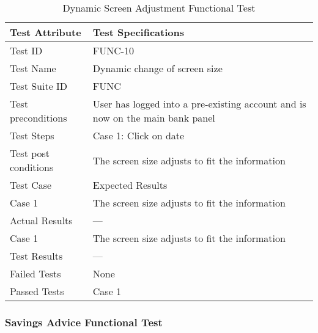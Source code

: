 \documentclass{article}
\begin{document}
\begin{table}[htbp]
\begin{center}
\begin{tabular}{|l | l|}
\hline
Test Attribute & Test Specifications \\
\hline
Test ID & FUNC-10 \\
\hline
Test Name  & Dynamic change of screen size \\
\hline
Test Suite  ID & FUNC \\
\hline
Test preconditions & User has logged into a pre-existing account and is now on the main bank panel \\
\hline
Test Steps & Case 1: Click on date\\
\hline
Test post conditions & The screen size adjusts to fit the information \\
\hline
Test Case & Expected Results\\
\hline
Case 1  &  The screen size adjusts to fit the information\\
\hline
Actual Results & ---\\
\hline
Case 1  &  The screen size adjusts to fit the information\\
\hline
Test Results & ---\\
\hline
Failed Tests & None\\
\hline
Passed Tests & Case 1\\
\hline
\end{tabular}
\end{center}
\caption{Dynamic Screen Adjustment Functional Test}
\end{table}
\label{table:2k}

\clearpage

\subsubsection{Savings Advice Functional Test}
\end{document}
